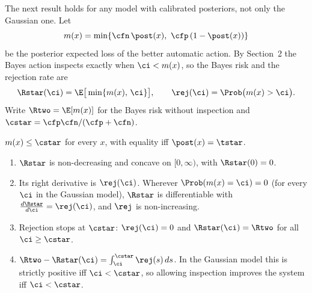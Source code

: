 The next result holds for any model with calibrated posteriors, not only the Gaussian one. Let
\[
  m(x) = \min\{\cfn\,\post(x),\ \cfp\,(1-\post(x))\}
\]
be the posterior expected loss of the better automatic action. By Section~2 the Bayes action
inspects exactly when $\ci < m(x)$, so the Bayes risk and the rejection rate are
\begin{equation}
  \Rstar(\ci) = \E\big[\min\{m(x),\,\ci\}\big], \qquad \rej(\ci) = \Prob\big(m(x) > \ci\big).
  \label{eq:t6-bayes-risk}
\end{equation}
Write $\Rtwo = \E[m(x)]$ for the Bayes risk without inspection and
$\cstar = \cfp\cfn/(\cfp+\cfn)$.

\begin{lemma}\label{lem:mmax}
$m(x)\le\cstar$ for every $x$, with equality iff $\post(x)=\tstar$.
\end{lemma}

\begin{proposition}\label{prop:risk-ci}
\begin{enumerate}[label=(\roman*),itemsep=1pt]
  \item $\Rstar$ is non-decreasing and concave on $[0,\infty)$, with $\Rstar(0)=0$.
  \item Its right derivative is $\rej(\ci)$. Wherever $\Prob(m(x)=\ci)=0$ (for every $\ci$ in the Gaussian
        model), $\Rstar$ is differentiable with $\frac{d\Rstar}{d\ci} = \rej(\ci)$, and $\rej$ is
        non-increasing.
  \item Rejection stops at $\cstar$: $\rej(\ci)=0$ and $\Rstar(\ci)=\Rtwo$ for all $\ci\ge\cstar$.
  \item $\Rtwo-\Rstar(\ci)=\int_{\ci}^{\cstar}\rej(s)\,ds$. In the Gaussian model this is strictly
        positive iff $\ci<\cstar$, so allowing inspection improves the system iff $\ci<\cstar$.
\end{enumerate}
\end{proposition}


